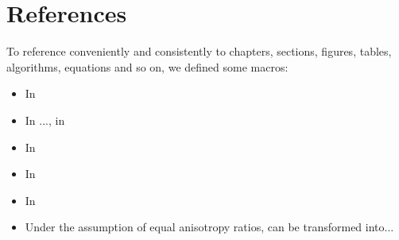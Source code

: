 \section{References}
\label{sec:meth:references}
To reference conveniently and consistently to chapters, sections, figures, tables, algorithms, equations and so on, we defined some macros:\\
\begin{itemize}
  \item In 
  \item In ..., in 
  \item In 
  \item In 
  \item In 
  \item Under the assumption of equal anisotropy ratios,  can be transformed into...
\end{itemize}

